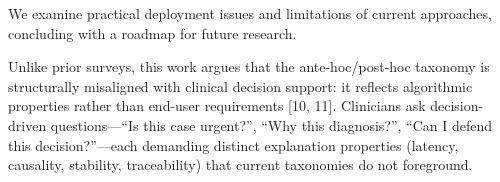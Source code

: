 \documentclass[pdflatex,sn-mathphys-num]{sn-jnl}%
\theoremstyle{thmstyleone}%
\theoremstyle{thmstyletwo}%
\theoremstyle{thmstylethree}%
\begin{document}
We examine practical deployment issues and limitations of current approaches, concluding with a roadmap for future research. 

Unlike prior surveys, this work argues that the ante-hoc/post-hoc taxonomy is structurally misaligned with clinical decision support: it reflects algorithmic properties rather than end-user requirements [10, 11]. Clinicians ask decision-driven questions—“Is this case urgent?”, “Why this diagnosis?”, “Can I defend this decision?”—each demanding distinct explanation properties (latency, causality, stability, traceability) that current taxonomies do not foreground. 
\end{document}
